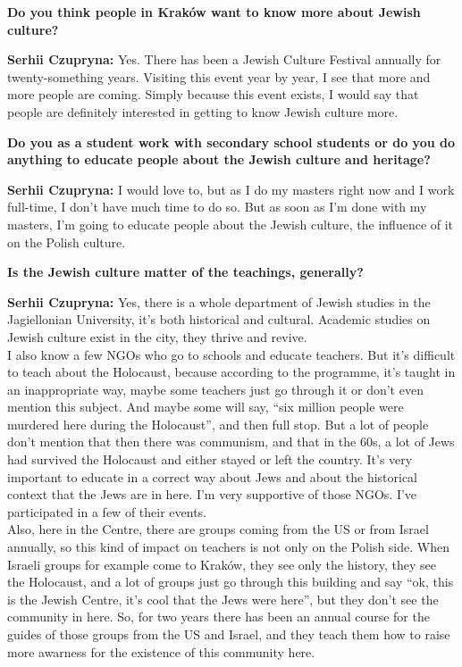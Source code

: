 \textbf{Do you think people in Kraków want to know more about Jewish culture?}\par
\textbf{Serhii Czupryna:} Yes. There has been a Jewish Culture Festival annually for twenty-something years. Visiting this event year by year, I see that more and more people are coming. Simply because this event exists, I would say that people are definitely interested in getting to know Jewish culture more.\par
\textbf{Do you as a student work with secondary school students or do you do anything to educate people about the Jewish culture and heritage?} \par
\textbf{Serhii Czupryna:} I would love to, but as I do my masters right now and I work full-time, I don’t have much time to do so. But as soon as I’m done with my masters, I’m going to educate people about the Jewish culture, the influence of it on the Polish culture.\par
\textbf{Is the Jewish culture matter of the teachings, generally?}\par
\textbf{Serhii Czupryna:} Yes, there is a whole department of Jewish studies in the Jagiellonian University, it’s both historical and cultural. Academic studies on Jewish culture exist in the city, they thrive and revive.\\ 
I also know a few NGOs who go to schools and educate teachers. But it’s difficult to teach about the Holocaust, because according to the programme, it’s taught in an inappropriate way, maybe some teachers just go through it or don’t even mention this subject. And maybe some will say, ``six million people were murdered here during the Holocaust'', and then full stop. But a lot of people don’t mention that then there was communism, and that in the 60s, a lot of Jews had survived the Holocaust and either stayed or left the country. It’s very important to educate in a correct way about Jews and about the historical context that the Jews are in here. I’m very supportive of those NGOs. I’ve participated in a few of their events.\\
Also, here in the Centre, there are groups coming from the US or from Israel annually, so this kind of impact on teachers is not only on the Polish side. When Israeli groups for example come to Kraków, they see only the history, they see the Holocaust, and a lot of groups just go through this building and say ``ok, this is the Jewish Centre, it’s cool that the Jews were here'', but they don’t see the community in here. So, for two years there has been an annual course for the guides of those groups from the US and Israel, and they teach them how to raise more awarness for the existence of this community here.\par  
